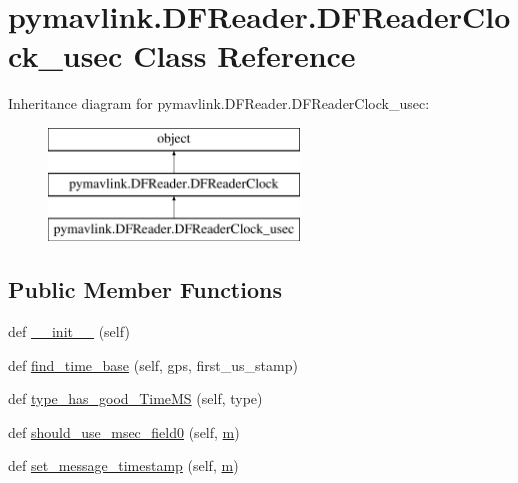 \hypertarget{classpymavlink_1_1DFReader_1_1DFReaderClock__usec}{}\section{pymavlink.\+D\+F\+Reader.\+D\+F\+Reader\+Clock\+\_\+usec Class Reference}
\label{classpymavlink_1_1DFReader_1_1DFReaderClock__usec}
Inheritance diagram for pymavlink.\+D\+F\+Reader.\+D\+F\+Reader\+Clock\+\_\+usec\+:\begin{figure}[H]
\begin{center}
\leavevmode
\includegraphics[height=3.000000cm]{classpymavlink_1_1DFReader_1_1DFReaderClock__usec}
\end{center}
\end{figure}
\subsection*{Public Member Functions}
\begin{DoxyCompactItemize}
\item 
def \mbox{\hyperlink{classpymavlink_1_1DFReader_1_1DFReaderClock__usec_a392d07c4a8ea07255cd30ecb41322e7c}{\+\_\+\+\_\+init\+\_\+\+\_\+}} (self)
\item 
def \mbox{\hyperlink{classpymavlink_1_1DFReader_1_1DFReaderClock__usec_a51f152f71a97dba73aab7ac85b834e0c}{find\+\_\+time\+\_\+base}} (self, gps, first\+\_\+us\+\_\+stamp)
\item 
def \mbox{\hyperlink{classpymavlink_1_1DFReader_1_1DFReaderClock__usec_a658ce3984924e888cdad51074ef580e1}{type\+\_\+has\+\_\+good\+\_\+\+Time\+MS}} (self, type)
\item 
def \mbox{\hyperlink{classpymavlink_1_1DFReader_1_1DFReaderClock__usec_aab8e5669f4942ae8623fc54fd28ce6af}{should\+\_\+use\+\_\+msec\+\_\+field0}} (self, \mbox{\hyperlink{namespacepymavlink_1_1DFReader_a41dcad484f9dfcaca656786d0882f168}{m}})
\item 
def \mbox{\hyperlink{classpymavlink_1_1DFReader_1_1DFReaderClock__usec_a27bbe7d8bf34d89c9eff353dc71252f0}{set\+\_\+message\+\_\+timestamp}} (self, \mbox{\hyperlink{namespacepymavlink_1_1DFReader_a41dcad484f9dfcaca656786d0882f168}{m}})
\end{DoxyCompactItemize}

